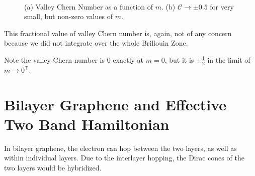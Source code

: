 \documentclass{report}
\begin{document}
\begin{figure}[h!]
	\centering
	\caption{(a) Valley Chern Number as a function of $m$. (b) $\mathcal{C} \rightarrow \pm 0.5$ for very small, but non-zero values of $m$.
	}~\label{Fig:inner_products}
\end{figure}

This fractional value of valley Chern number is, again, not of any concern because we did not integrate over the whole Brillouin Zone.

Note the valley Chern number is $0$ exactly at $m= 0$, but it is $\pm \frac{1}{2}$ in the limit of $m \rightarrow 0^\mp$.

\section{Bilayer Graphene and Effective Two Band Hamiltonian}
In bilayer graphene, the electron can hop between the two layers, as well as within individual layers. Due to the interlayer hopping, the Dirac cones of the two layers would be hybridized.
\end{document}
